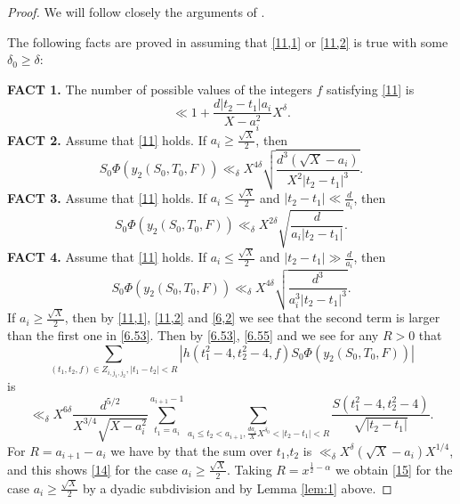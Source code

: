 \documentclass[12pt]{amsart}
\theoremstyle{definition}
\numberwithin{equation}{section}
\begin{document}
\begin{proof}We will follow closely the arguments of \cite[Subsection
6.7]{Biro}.

The following facts are proved in \cite[Subsection
6.7]{Biro} assuming that \eqref{11,1} or \eqref{11,2} is true with some $
\delta_0\ge\delta$:

{\bf FACT 1.} The number of possible values of the integers $f$ satisfying \eqref{11} is
\begin{equation}\ll 1+\frac {d\left|t_2-t_1\right|a_i}{X-a_i^2}X^{
\delta}.\label{6.53}\end{equation}
{\bf FACT 2.} Assume that \eqref{11} holds. If $a_i\ge\frac {\sqrt {
X}}2$, then
\begin{equation}S_0\Phi\left(y_2\left(S_0,T_0,F\right)\right)\ll_{
\delta}X^{4\delta}\sqrt {\frac {d^3\left(\sqrt {X}-a_i\right)}{X^
2\left|t_2-t_1\right|^3}}.\label{6.55}\end{equation}
{\bf FACT 3.} Assume that \eqref{11} holds. If $a_i\le\frac {\sqrt {
X}}2$ and $\left|t_2-t_1\right|\ll\frac d{a_i}$, then
\begin{equation}S_0\Phi\left(y_2\left(S_0,T_0,F\right)\right)\ll_{
\delta}X^{2\delta}\sqrt {\frac d{a_i\left|t_2-t_1\right|}}.\label{6.56}\end{equation}
{\bf FACT 4.} Assume that \eqref{11} holds. If $a_i\le\frac {\sqrt {
X}}2$ and $\left|t_2-t_1\right|\gg\frac d{a_i}$, then
\begin{equation}S_0\Phi\left(y_2\left(S_0,T_0,F\right)\right)\ll_{
\delta}X^{4\delta}\sqrt {\frac {d^3}{a_i^3\left|t_2-t_1\right|^3}}
.\label{6.57}\end{equation}
If $a_i\ge\frac {\sqrt {X}}2$, then by \eqref{11,1}, \eqref{11,2} and  \eqref{6,2}
we see that the second term is larger than the first one
in \eqref{6.53}. Then by \eqref{6.53}, \eqref{6.55} and
\cite[Lemma 3.1]{Biro} we see for any $R>0$ that
\begin{equation}\sum_{\left(t_1,t_2,f\right)\in Z_{i,j_1,j_2},\left
|t_1-t_2\right|<R}\left|h\left(t_1^2-4,t_2^2-4,f\right)S_0\Phi\left
(y_2\left(S_0,T_0,F\right)\right)\right|\end{equation}
is
\[\ll_{\delta}X^{6\delta}\frac {d^{5/2}}{X^{3/4}\sqrt {X-a_i^2}}\sum_{
t_1=a_i}^{a_{i+1}-1}\sum_{a_i\le t_2<a_{i+1},\frac {da_i}XX^{\delta_
0}<\left|t_2-t_1\right|<R}\frac {S\left(t^2_1-4,t^2_2-4\right)}{\sqrt {\left
|t_2-t_1\right|}}.\]
For $R=a_{i+1}-a_i$ we have by \cite[(3.21)]{Biro} that the sum
over $t_1$,$t_2$ is $\ll_{\delta}X^{\delta}\left(\sqrt {X}-a_i\right
)X^{1/4}$, and this shows
\eqref{14} for the case $a_i\ge\frac {\sqrt {X}}2$. Taking $R=x^{\frac
12-\alpha}$ we
obtain \eqref{15} for the case $a_i\ge\frac {\sqrt {X}}2$ by a dyadic
subdivision and by Lemma \ref{lem:1} above.


\end{proof}
\end{document}
